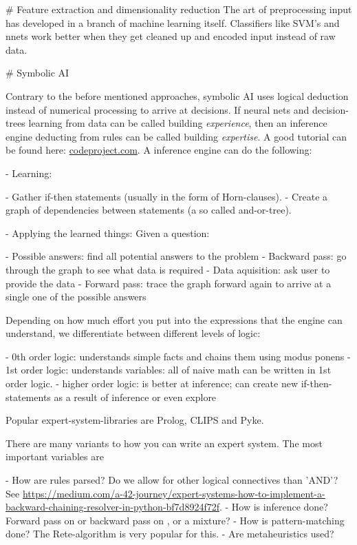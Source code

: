 # Feature extraction and dimensionality reduction
The art of preprocessing input has developed in a branch of machine learning itself. Classifiers like SVM's and nnets work better when they get cleaned up and encoded input instead of raw data. 



# Symbolic AI

Contrary to the before mentioned approaches, symbolic AI uses logical deduction instead of numerical processing to arrive at decisions. If neural nets and decision-trees learning from data can be called building \emph{experience}, then an inference engine deducting from rules can be called building \emph{expertise}. A good tutorial can be found here: \href{codeproject.com/Articles/179375/Man-Marriage-and-Machine-Adventures-in-Artificia}{codeproject.com}.
A inference engine can do the following: 

	- Learning: 
		
			- Gather if-then statements (usually in the form of Horn-clauses).
			- Create a graph of dependencies between statements (a so called and-or-tree).
		
	- Applying the learned things: Given a question: 
		
			- Possible answers: find all potential answers to the problem
			- Backward pass: go through the graph to see what data is required
			- Data aquisition: ask user to provide the data
			- Forward pass: trace the graph forward again to arrive at a single one of the possible answers
		


Depending on how much effort you put into the expressions that the engine can understand, we differentiate between different levels of logic: 

    - 0th order logic: understands simple facts and chains them using modus ponens
    - 1st order logic: understands variables: all of naive math can be written in 1st order logic.
    - higher order logic: is better at inference; can create new if-then-statements as a result of inference or even explore


Popular expert-system-libraries are Prolog, CLIPS and Pyke.

There are many variants to how you can write an expert system. 
The most important variables are 

	- How are rules parsed? Do we allow for other logical connectives than 'AND'? See \href{this example}{https://medium.com/a-42-journey/expert-systems-how-to-implement-a-backward-chaining-resolver-in-python-bf7d8924f72f}.
	- How is inference done? Forward pass on  or backward pass on , or a mixture? 
	- How is pattern-matching done? The Rete-algorithm is very popular for this.
	- Are metaheuristics used? 
		
